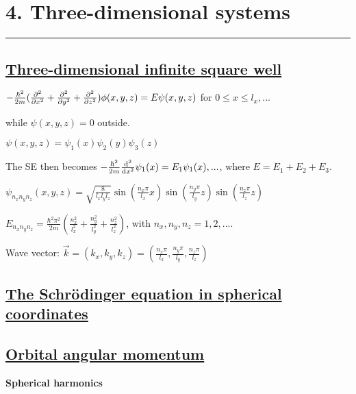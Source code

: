 \section{4. Three-dimensional systems} \hrule height 0.3pt \thinspace

\subsection{\underline{Three-dimensional infinite square well}}

$-\frac{\hbar^2}{2m}(\pdv[2]{}{x} + \pdv[2]{}{y} + \pdv[2]{}{z}) \phi(x, y, z) = E \psi(x, y, z)$ for $0 \leq x \leq l_x, ...$

while $\psi(x, y, z) = 0$ outside.

$\psi(x, y, z) = \psi_1(x) \psi_2(y) \psi_3(z)$

The SE then becomes $-\frac{\hbar^2}{2m} \dv[2]{}{x} \psi_1(x) = E_1 \psi_1(x), ...$, where $E = E_1 + E_2 + E_3$.

$\psi_{n_x n_y n_z}(x, y, z) = \sqrt{\frac{8}{l_x l_y l_z}} \sin(\frac{n_x \pi}{l_x} x) \sin(\frac{n_y \pi}{l_y} z) \sin(\frac{n_z \pi}{l_z} z)$

$E_{n_x n_y n_z} = \frac{\hbar^2 \pi^2}{2m} (\frac{n^2_x}{l^2_x} + \frac{n^2_y}{l^2_y} + \frac{n^2_z}{l^2_z})$, with $n_x, n_y, n_z = 1, 2, ...$.

Wave vector: $\vec{k} = (k_x, k_y, k_z) = (\frac{n_x \pi}{l_x}, \frac{n_y \pi}{l_y}, \frac{n_z \pi}{l_z})$

\subsection{\underline{The Schr\"odinger equation in spherical coordinates}}

\subsection{\underline{Orbital angular momentum}}

\textbf{Spherical harmonics}



